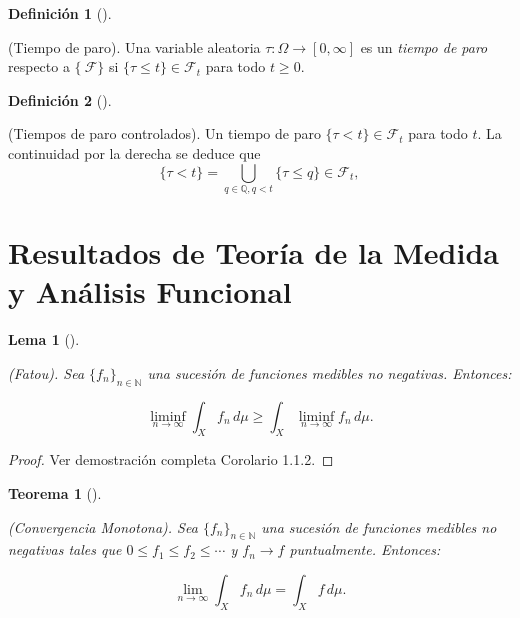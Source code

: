 \documentclass[
  spanish,
  us-letterpaper,
]{scrreprt}
\theoremstyle{plain}
\newtheorem{theorem}{Teorema}[chapter]
\theoremstyle{plain}
\newtheorem{lemma}{Lema}[chapter]
\theoremstyle{definition}
\newtheorem{definition}{Definición}[chapter]
\theoremstyle{remark}
\begin{document}
\begin{definition}[]\protect\hypertarget{def-tiempo_paro}{}\label{def-tiempo_paro}

(Tiempo de paro). Una variable aleatoria
\(\tau : \Omega \to [0,\infty]\) es un \emph{tiempo de paro} respecto a
\(\{\ \mathcal{F} \}\) si \(\{\tau \leq t\} \in \mathcal{F}_t\) para
todo \(t \geq 0\).

\end{definition}

\begin{definition}[]\protect\hypertarget{def-Tiempos_paro_controlados}{}\label{def-Tiempos_paro_controlados}

(Tiempos de paro controlados). Un tiempo de paro
\(\{\tau < t\} \in \mathcal{F}_t\) para todo \(t\). La continuidad por
la derecha se deduce que
\[\{\tau < t\} = \bigcup_{q \in \mathbb{Q}, q < t} \{\tau \leq q\} \in \mathcal{F}_t,\]

\end{definition}

\section{Resultados de Teoría de la Medida y Análisis
Funcional}\label{resultados-de-teoruxeda-de-la-medida-y-anuxe1lisis-funcional}

\begin{lemma}[]\protect\hypertarget{lem-Fatou}{}\label{lem-Fatou}

\emph{(Fatou).} Sea \(\{f_n\}_{n \in \mathbb{N}}\) una sucesión de
funciones medibles no negativas. Entonces:

\[\liminf_{n \to \infty} \int_X f_n \, d\mu \geq \int_X \liminf_{n \to \infty} f_n \, d\mu.\]

\end{lemma}

\begin{proof}
Ver demostración completa \textcite{applebaum2009levy} Corolario 1.1.2.
\end{proof}

\begin{theorem}[]\protect\hypertarget{thm-con_monotona}{}\label{thm-con_monotona}

\emph{(Convergencia Monotona).} Sea \(\{f_n\}_{n \in \mathbb{N}}\) una
sucesión de funciones medibles no negativas tales que
\(0 \leq f_1 \leq f_2 \leq \cdots\) y \(f_n \to f\) puntualmente.
Entonces:

\[\lim_{n \to \infty} \int_X f_n \, d\mu = \int_X f \, d\mu.\]

\end{theorem}
\end{document}

